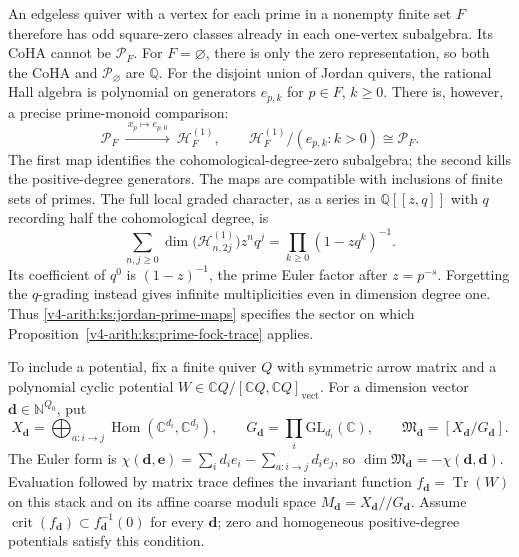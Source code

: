 An edgeless quiver with a vertex for each prime in a nonempty finite
set $F$ therefore has odd square-zero classes already in each
one-vertex subalgebra. Its CoHA cannot be $\mathcal P_F$.
For $F=\varnothing$, there is only the zero representation, so both
the CoHA and $\mathcal P_{\varnothing}$ are $\mathbb Q$.
For the disjoint union of Jordan quivers, the rational Hall algebra
is polynomial on generators $e_{p,k}$ for $p\in F$, $k\geq0$.
There is, however, a precise prime-monoid comparison:
\begin{equation}
 \mathcal P_F\ \xrightarrow{\ x_p\mapsto e_{p,0}\ }\
 \mathcal H_F^{(1)},\qquad
 \mathcal H_F^{(1)}/(e_{p,k}:k>0)\cong\mathcal P_F.
 \label{v4-arith:ks:jordan-prime-maps}
\end{equation}
The first map identifies the cohomological-degree-zero subalgebra;
the second kills the positive-degree generators. The maps are
compatible with inclusions of finite sets of primes. The full local
graded character, as a series in $\mathbb Q[[z,q]]$ with $q$ recording
half the cohomological degree, is
\[
 \sum_{n,j\geq0}\dim\bigl(\mathcal H^{(1)}_{n,2j}\bigr)z^nq^j
   =\prod_{k\geq0}(1-zq^k)^{-1}.
\]
Its coefficient of $q^0$ is $(1-z)^{-1}$, the prime Euler factor
after $z=p^{-s}$. Forgetting the $q$-grading instead gives infinite
multiplicities even in dimension degree one. Thus
\eqref{v4-arith:ks:jordan-prime-maps} specifies the sector on which
Proposition~\ref{v4-arith:ks:prime-fock-trace} applies.

To include a potential, fix a finite quiver $Q$ with symmetric arrow
matrix and a polynomial cyclic potential
$W\in\mathbb C Q/[\mathbb C Q,\mathbb C Q]_{\mathrm{vect}}$.
For a dimension vector $\mathbf d\in\mathbb N^{Q_0}$, put
\[
 X_{\mathbf d}=\bigoplus_{a:i\to j}
     \operatorname{Hom}(\mathbb C^{d_i},\mathbb C^{d_j}),\qquad
 G_{\mathbf d}=\prod_i\mathrm{GL}_{d_i}(\mathbb C),\qquad
 \mathfrak M_{\mathbf d}=[X_{\mathbf d}/G_{\mathbf d}].
\]
The Euler form is
$\chi(\mathbf d,\mathbf e)=\sum_i d_ie_i-\sum_{a:i\to j}d_ie_j$,
so $\dim\mathfrak M_{\mathbf d}=-\chi(\mathbf d,\mathbf d)$.
Evaluation followed by matrix trace defines the invariant function
$f_{\mathbf d}=\operatorname{Tr}(W)$ on this stack and on its affine
coarse moduli space $M_{\mathbf d}=X_{\mathbf d}/\!/G_{\mathbf d}$.
Assume $\operatorname{crit}(f_{\mathbf d})\subset f_{\mathbf d}^{-1}(0)$
for every $\mathbf d$; zero and homogeneous positive-degree potentials
satisfy this condition.

